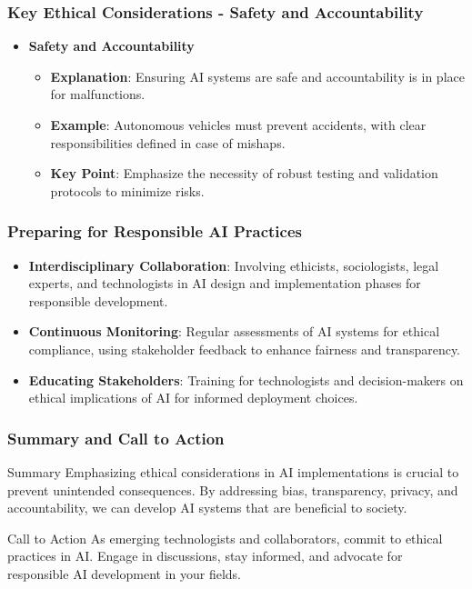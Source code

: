 \documentclass[aspectratio=169]{beamer}
\begin{document}
\begin{frame}[fragile]
    \frametitle{Key Ethical Considerations - Safety and Accountability}
    \begin{itemize}
        \item \textbf{Safety and Accountability}
        \begin{itemize}
            \item \textbf{Explanation}: Ensuring AI systems are safe and accountability is in place for malfunctions.
            \item \textbf{Example}: Autonomous vehicles must prevent accidents, with clear responsibilities defined in case of mishaps.
            \item \textbf{Key Point}: Emphasize the necessity of robust testing and validation protocols to minimize risks.
        \end{itemize}
    \end{itemize}
\end{frame}

\begin{frame}[fragile]
    \frametitle{Preparing for Responsible AI Practices}
    \begin{itemize}
        \item \textbf{Interdisciplinary Collaboration}: Involving ethicists, sociologists, legal experts, and technologists in AI design and implementation phases for responsible development.
        \item \textbf{Continuous Monitoring}: Regular assessments of AI systems for ethical compliance, using stakeholder feedback to enhance fairness and transparency.
        \item \textbf{Educating Stakeholders}: Training for technologists and decision-makers on ethical implications of AI for informed deployment choices.
    \end{itemize}
\end{frame}

\begin{frame}[fragile]
    \frametitle{Summary and Call to Action}
    \begin{block}{Summary}
        Emphasizing ethical considerations in AI implementations is crucial to prevent unintended consequences. By addressing bias, transparency, privacy, and accountability, we can develop AI systems that are beneficial to society.
    \end{block}
    
    \begin{block}{Call to Action}
        As emerging technologists and collaborators, commit to ethical practices in AI. Engage in discussions, stay informed, and advocate for responsible AI development in your fields.
    \end{block}
\end{frame}
\end{document}
